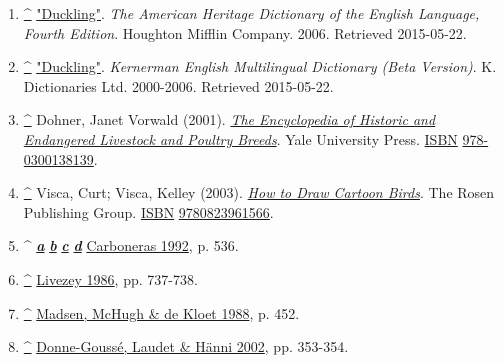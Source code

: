 \documentclass[11pt,a4paper]{article}
\begin{document}
\begin{enumerate}
\item \href{\#cite\_ref-1}{\textbf{\textasciicircum{}}} \href{http://dictionary.reference.com/browse/duckling}{"Duckling"}. \textit{The American Heritage Dictionary of the English Language, Fourth Edition}. Houghton Mifflin Company. 2006. Retrieved 2015-05-22.
\item \href{\#cite\_ref-2}{\textbf{\textasciicircum{}}} \href{http://dictionary.reference.com/browse/duckling}{"Duckling"}. \textit{Kernerman English Multilingual Dictionary (Beta Version)}. K. Dictionaries Ltd. 2000-2006. Retrieved 2015-05-22.
\item \href{\#cite\_ref-3}{\textbf{\textasciicircum{}}} Dohner, Janet Vorwald (2001). \href{https://books.google.com/books?id=WJCTL\_mC5w4C\&q=male+duck+is+called+a+drake+and+the+female+is+called+a+duck\&pg=PA457}{\textit{The Encyclopedia of Historic and Endangered Livestock and Poultry Breeds}}. Yale University Press. \href{/wiki/ISBN\_\%28identifier\%29}{ISBN} \href{/wiki/Special:BookSources/978-0300138139}{978-0300138139}.
\item \href{\#cite\_ref-4}{\textbf{\textasciicircum{}}} Visca, Curt; Visca, Kelley (2003). \href{https://books.google.com/books?id=VqSquCLNrZcC\&q=male+duck+is+called+a+drake+and+the+female+is+called+a+duck+\%28or+hen\%29\&pg=PA16}{\textit{How to Draw Cartoon Birds}}. The Rosen Publishing Group. \href{/wiki/ISBN\_\%28identifier\%29}{ISBN} \href{/wiki/Special:BookSources/9780823961566}{9780823961566}.
\item \textasciicircum{} \href{\#cite\_ref-FOOTNOTECarboneras1992536\_5-0}{\textit{\textbf{a}}} \href{\#cite\_ref-FOOTNOTECarboneras1992536\_5-1}{\textit{\textbf{b}}} \href{\#cite\_ref-FOOTNOTECarboneras1992536\_5-2}{\textit{\textbf{c}}} \href{\#cite\_ref-FOOTNOTECarboneras1992536\_5-3}{\textit{\textbf{d}}} \href{\#CITEREFCarboneras1992}{Carboneras 1992}, p. 536.
\item \href{\#cite\_ref-FOOTNOTELivezey1986737–738\_6-0}{\textbf{\textasciicircum{}}} \href{\#CITEREFLivezey1986}{Livezey 1986}, pp. 737-738.
\item \href{\#cite\_ref-FOOTNOTEMadsenMcHughde\_Kloet1988452\_7-0}{\textbf{\textasciicircum{}}} \href{\#CITEREFMadsenMcHughde\_Kloet1988}{Madsen, McHugh \& de Kloet 1988}, p. 452.
\item \href{\#cite\_ref-FOOTNOTEDonne-GousséLaudetHänni2002353–354\_8-0}{\textbf{\textasciicircum{}}} \href{\#CITEREFDonne-GousséLaudetHänni2002}{Donne-Goussé, Laudet \& Hänni 2002}, pp. 353-354.

\end{enumerate}
\end{document}
